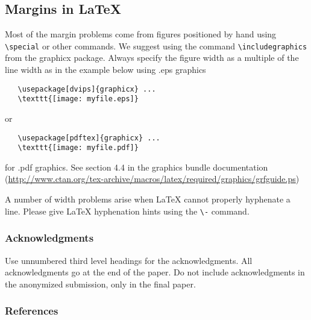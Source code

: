 \documentclass{article} %
\begin{document}
\subsection{Margins in LaTeX}
 
Most of the margin problems come from figures positioned by hand using
\verb+\special+ or other commands. We suggest using the command
\verb+\includegraphics+
from the graphicx package. Always specify the figure width as a multiple of
the line width as in the example below using .eps graphics
\begin{verbatim}
   \usepackage[dvips]{graphicx} ... 
   \texttt{[image: myfile.eps]} 
\end{verbatim}
or %
\begin{verbatim}
   \usepackage[pdftex]{graphicx} ... 
   \texttt{[image: myfile.pdf]} 
\end{verbatim}
for .pdf graphics. 
See section 4.4 in the graphics bundle documentation (\url{http://www.ctan.org/tex-archive/macros/latex/required/graphics/grfguide.ps}) 
 
A number of width problems arise when LaTeX cannot properly hyphenate a
line. Please give LaTeX hyphenation hints using the \verb+\-+ command.


\subsubsection*{Acknowledgments}

Use unnumbered third level headings for the acknowledgments. All
acknowledgments go at the end of the paper. Do not include 
acknowledgments in the anonymized submission, only in the 
final paper. 

\subsubsection*{References}




\end{document}

